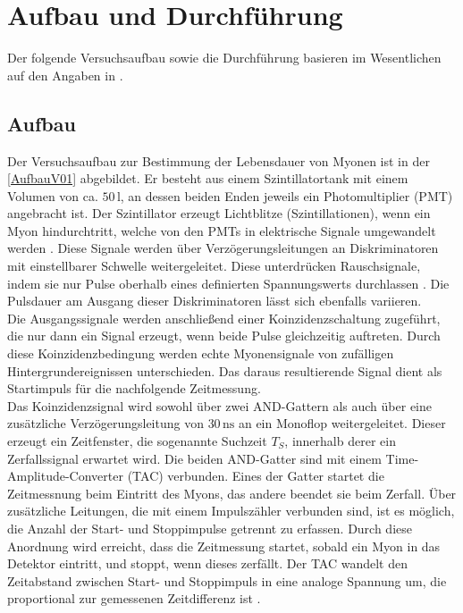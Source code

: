 \section{Aufbau und Durchführung}
Der folgende Versuchsaufbau sowie die Durchführung basieren im Wesentlichen auf den Angaben in \cite{anleitungV01}.
\subsection{Aufbau}
\label{Aufbau}
Der Versuchsaufbau zur Bestimmung der Lebensdauer von Myonen ist in der \autoref{AufbauV01} abgebildet.
Er besteht aus einem Szintillatortank mit einem Volumen von ca. $50\,\unit{\litre}$, an dessen beiden Enden jeweils ein Photomultiplier (PMT) angebracht ist.
Der Szintillator erzeugt Lichtblitze (Szintillationen), wenn ein Myon hindurchtritt, welche von den PMTs in elektrische Signale umgewandelt werden \cite{Teilchendetektoren}.
Diese Signale werden über Verzögerungsleitungen an Diskriminatoren mit einstellbarer Schwelle weitergeleitet. Diese unterdrücken Rauschsignale, indem sie nur Pulse oberhalb eines definierten Spannungswerts durchlassen \cite{Techniques}.
Die Pulsdauer am Ausgang dieser Diskriminatoren lässt sich ebenfalls variieren.\\
Die Ausgangssignale werden anschließend einer Koinzidenzschaltung zugeführt, 
die nur dann ein Signal erzeugt, wenn beide Pulse gleichzeitig auftreten. 
Durch diese Koinzidenzbedingung werden echte Myonensignale von zufälligen Hintergrundereignissen unterschieden.
Das daraus resultierende Signal dient als Startimpuls für die nachfolgende Zeitmessung.\\
Das Koinzidenzsignal wird sowohl über zwei AND-Gattern als auch über eine zusätzliche Verzögerungsleitung von $30\,\unit{\nano\second}$ an ein Monoflop
weitergeleitet. Dieser erzeugt ein Zeitfenster, die sogenannte Suchzeit $T_S$, innerhalb derer ein Zerfallssignal erwartet wird. 
Die beiden AND-Gatter sind mit einem Time-Amplitude-Converter (TAC) verbunden. Eines der Gatter startet die Zeitmessnung beim Eintritt
des Myons, das andere beendet sie beim Zerfall.
Über zusätzliche Leitungen, die mit einem Impulszähler verbunden sind, ist es möglich, die Anzahl der
Start- und Stoppimpulse getrennt zu erfassen. Durch diese Anordnung wird erreicht, dass die Zeitmessung startet, sobald ein Myon in das Detektor eintritt, und stoppt, wenn dieses zerfällt. 
Der TAC wandelt den Zeitabstand zwischen Start- und Stoppimpuls in eine analoge Spannung um, die proportional zur gemessenen Zeitdifferenz ist \cite{Techniques}.\\
